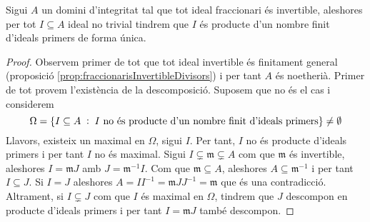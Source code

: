 \documentclass[../../../main.tex]{subfiles}
\begin{document}
\begin{ter}
\label{ter:lastTeorem} Sigui $A$ un domini d'integritat tal que tot ideal fraccionari és invertible, aleshores per tot $I\subseteq A$ ideal no trivial tindrem que $I$ és producte d'un nombre finit d'ideals primers de forma única.
\end{ter}
\begin{proof}
Observem primer de tot que tot ideal invertible és finitament general (proposició \ref{prop:fraccionarisInvertibleDivisors}) i per tant $A$ és noetherià. Primer de tot provem l'existència de la descomposició. Suposem que no és el cas i considerem 
\begin{equation}
    \notag
    \Omega = \{ I\subseteq A\;:\;\text{$I$ no és producte d'un nombre finit d'ideals primers}\}\neq \emptyset
\end{equation}
Llavors, existeix un maximal en $\Omega$, sigui $I$. Per tant, $I$ no és producte d'ideals primers i per tant $I$ no és maximal. Sigui $I\varsubsetneq \mathfrak{m}\varsubsetneq A$ com que $\mathfrak{m}$ és invertible, aleshores $I = \mathfrak{m}J$ amb $J = \mathfrak{m}^{-1}I$. Com que $\mathfrak{m}\subseteq A$, aleshores $A\subseteq \mathfrak{m}^{-1}$ i per tant $I\subseteq J$. Si $I = J$ aleshores $A = II^{-1} = \mathfrak{m}JJ^{-1} = \mathfrak{m}$ que és una contradicció. Altrament, si $I\varsubsetneq J$ com que $I$ és maximal en $\Omega$, tindrem que $J$ descompon en producte d'ideals primers i per tant $I = \mathfrak{m}J$ també descompon. 


\end{proof}
\end{document}
